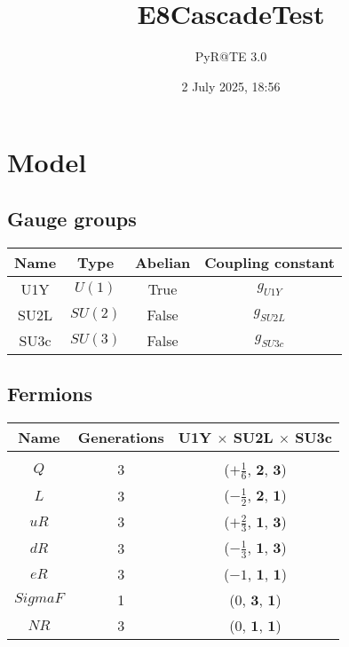 \documentclass[12pt]{article}
\title{E8CascadeTest}
\author{PyR@TE 3.0}
\date{2 July 2025, 18:56}
\begin{document}
    \maketitle
    \tableofcontents
    \clearpage

\section{Model}

\subsection{Gauge groups}

\begin{table}[h]
\renewcommand{\arraystretch}{1.3}
\centering
\begin{tabular}{c@{\hskip .66cm}c@{\hskip .66cm}c@{\hskip .5cm}c}
\hline
Name & Type & Abelian & Coupling constant \\ \hline
U1Y & $U(1)$ & True & $g_{U1Y}$ \\
SU2L & $SU(2)$ & False & $g_{SU2L}$ \\
SU3c & $SU(3)$ & False & $g_{SU3c}$ \\ \hline
\end{tabular}
\end{table}

\subsection{Fermions}

\begin{table}[h]
\renewcommand{\arraystretch}{1.15}
\centering
\begin{tabular}{c@{\hskip .66cm}c@{\hskip .66cm}c}
\hline
Name & Generations & U1Y $\times$ SU2L $\times$ SU3c\\ \hline \\ [-2ex]
$Q$ & 3 & ($+\frac{1}{6}$, $\mathbf{2}$, $\mathbf{3}$) \\[.2cm]
$L$ & 3 & ($- \frac{1}{2}$, $\mathbf{2}$, $\mathbf{1}$) \\[.2cm]
$uR$ & 3 & ($+\frac{2}{3}$, $\mathbf{1}$, $\mathbf{3}$) \\[.2cm]
$dR$ & 3 & ($- \frac{1}{3}$, $\mathbf{1}$, $\mathbf{3}$) \\[.2cm]
$eR$ & 3 & ($-1$, $\mathbf{1}$, $\mathbf{1}$) \\[.2cm]
$SigmaF$ & 1 & ($0$, $\mathbf{3}$, $\mathbf{1}$) \\[.2cm]
$NR$ & 3 & ($0$, $\mathbf{1}$, $\mathbf{1}$) \\[.1cm] \hline
\end{tabular}
\end{table}
\end{document}

